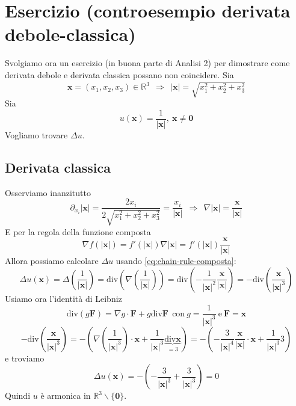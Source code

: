 \documentclass[10pt,a4paper,twoside,openright]{book}
\newcommand{\x}{\mathbf{x}}
\newcommand{\zer}{\mathbf{0}}
\begin{document}
\section{Esercizio (controesempio derivata debole-classica)}
\label{sec:controesempio-derivata-debole-classica}

Svolgiamo ora un esercizio (in buona parte di Analisi 2) per dimostrare come derivata debole e derivata classica possano non coincidere. Sia
\begin{equation*}
    \x =(x_{1} ,x_{2} ,x_{3}) \in \mathbb{R}^{3} \ \ \Rightarrow \ \ | \x| =\sqrt{x^{2}_{1} +x^{2}_{2} +x^{2}_{3}}
\end{equation*}
Sia
\begin{equation*}
    u(\x) =\frac{1}{| \x| } ,\ \x \neq \zer
\end{equation*}
Vogliamo trovare $\displaystyle \Delta u$.

\subsection{Derivata classica}

Osserviamo inanzitutto
\begin{equation*}
    \partial _{x_{i}}| \x| =\frac{2x_{i}}{2\sqrt{x_{1}^{2} +x_{2}^{2} +x_{3}^{2}}} =\frac{x_{i}}{|\x| } \ \ \Rightarrow \ \ \nabla | \x| =\frac{\x}{| \x| }
\end{equation*}
E per la regola della funzione composta
\begin{equation}
    \nabla f(| \x|) =f'(| \x|) \nabla | \x| =f'(| \x|)\frac{\x}{| \x| }
    \label{eq:chain-rule-composta}
\end{equation}
Allora possiamo calcolare $\displaystyle \Delta u$ usando \eqref{eq:chain-rule-composta}:
\begin{equation*}
    \Delta u(\x) =\Delta \left(\frac{1}{| \x| }\right) =\mathrm{div}\left(\nabla \left(\frac{1}{| \x| }\right)\right) =\mathrm{div}\left(-\frac{1}{| \x| ^{2}}\frac{\x}{| \x| }\right) =-\mathrm{div}\left(\frac{\x}{| \x| ^{3}}\right)
\end{equation*}
Usiamo ora l'identità di Leibniz
\begin{equation*}
    \mathrm{div}(g\mathbf{F}) =\nabla g\cdotp \mathbf{F} +g\mathrm{div}\mathbf{F} \ \ \text{con} \ g=\frac{1}{| \x| ^{3}} \ \text{e} \ \mathbf{F} =\x
\end{equation*}
\begin{equation*}
    -\mathrm{div}\left(\frac{\x}{| \x| ^{3}}\right) =-\left(\nabla \left(\frac{1}{| \x| ^{3}}\right) \cdotp \x +\frac{1}{| \x| ^{3}}\underbrace{\mathrm{div}\x}_{=3}\right) =-\left(-\frac{3}{| \x| ^{4}}\frac{\x}{| \x| } \cdotp \x +\frac{1}{| \x| ^{3}} 3\right)
\end{equation*}
e troviamo
\begin{equation*}
    \Delta u(\x) =-\left(-\frac{3}{| \x| ^{3}} +\frac{3}{| \x| ^{3}}\right) =0
\end{equation*}
Quindi $u$ è armonica in $\displaystyle \mathbb{R}^{3} \backslash \{\zer\}$.
\end{document}

